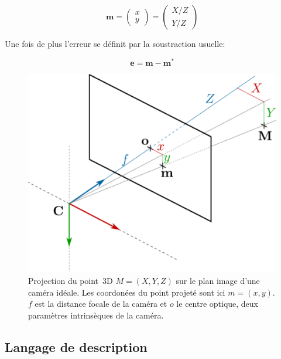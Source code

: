 \begin{equation}
  \mathbf{m} = \left(
  \begin{array}{c}
    x\\
    y
  \end{array}
  \right) = \left(
  \begin{array}{c}
    X / Z\\
    Y / Z
  \end{array}
  \right)
\end{equation}


Une fois de plus l'erreur se définit par la soustraction usuelle:

\begin{equation}
  \mathbf{e} = \mathbf{m} - \mathbf{m}^*
\end{equation}

\begin{figure}
  \begin{center}
    \includegraphics[width=.95\linewidth]{src/chap3-primitive-mouvement/cameraProj.pdf}
  \end{center}
  \caption{Projection du point 3D $M = (X, Y, Z)$ sur le plan image
    d'une caméra idéale. Les coordonées du point projeté sont ici $m =
    (x, y)$. $f$ est la distance focale de la caméra et $o$ le centre
    optique, deux paramètres intrinsèques de la caméra.}
\end{figure}




\subsection{Langage de description}


